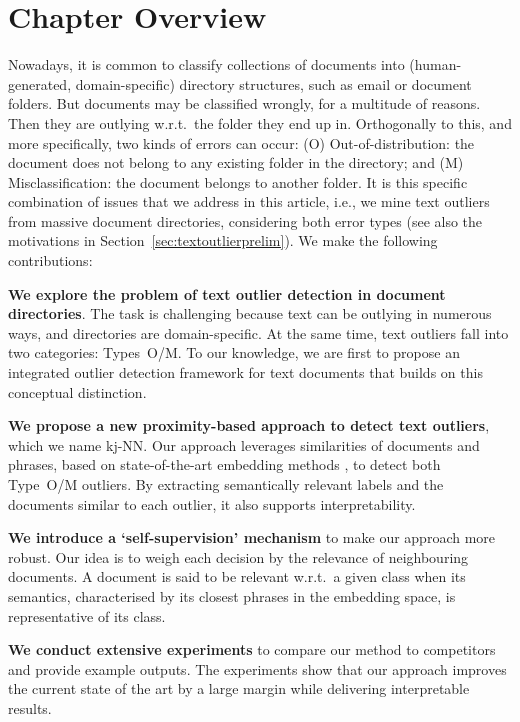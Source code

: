 \section{Chapter Overview}

Nowadays, it is common to classify collections of documents into (human-generated, domain-specific) directory structures, such as email or document folders. But documents may be classified wrongly, for a multitude of reasons. Then they are outlying w.r.t.\ the folder they end up in. Orthogonally to this, and more specifically, two kinds of errors can occur: (O) Out-of-distribution: the document does not belong to any existing folder in the directory; and (M) Misclassification: the document belongs to another folder. It is this specific combination of issues that we address in this article, i.e., we mine text outliers from massive document directories, considering both error types (see also the motivations in Section~\ref{sec:textoutlierprelim}). We make the following contributions:  

\textbf{We explore the problem of text outlier detection in document directories}. The task is challenging because text can be outlying in numerous ways, and directories are domain-specific. At the same time, text outliers fall into two categories: Types~O/M. 
To our knowledge, we are first to propose an integrated outlier detection framework for text documents that builds on this conceptual distinction. 

\textbf{We propose a new proximity-based approach to detect text outliers}, which we name \gls{kj-NN}. Our approach leverages similarities of documents and phrases, based on state-of-the-art embedding methods \cite{meng2019spherical}, to detect both Type~O/M outliers. By extracting semantically relevant labels and the documents similar to each outlier, it also supports interpretability. 

\textbf{We introduce a `self-supervision' mechanism} to make our approach more robust. Our idea is to weigh each decision by the relevance of neighbouring documents. A document is said to be relevant w.r.t.\ a given class when its semantics, characterised by its closest phrases in the embedding space, is representative of its class. 

\textbf{We conduct extensive experiments} to compare our method to competitors and provide example outputs. The experiments show that our approach improves the current state of the art by a large margin while delivering interpretable results.


